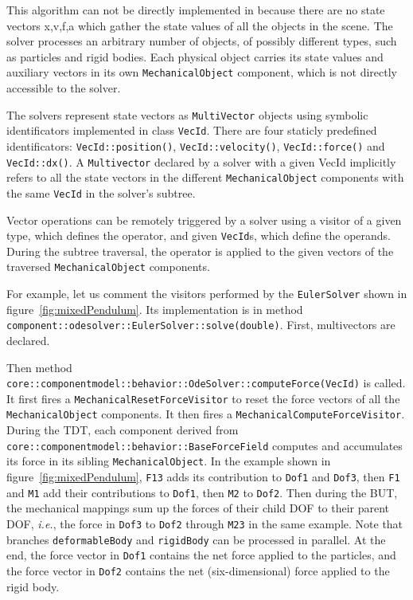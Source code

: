 This algorithm can not be directly implemented in \sofa because there are no state vectors x,v,f,a which gather the state values of all the objects in the scene.
The solver processes an arbitrary number of objects, of possibly different types, such as particles and rigid bodies. Each physical object carries its state values and auxiliary vectors in its own \texttt{MechanicalObject} component, which is not directly accessible to the solver.

The solvers represent state vectors as \texttt{MultiVector} objects using symbolic identificators implemented in class \texttt{VecId}.
There are four staticly predefined identificators: \texttt{VecId::position()}, \texttt{VecId::velocity()}, \texttt{VecId::force()} and \texttt{VecId::dx()}.
A \texttt{Multivector} declared by a solver with a given VecId implicitly refers to all the state vectors in the different \texttt{MechanicalObject} components with the same \texttt{VecId} in the solver's subtree.

Vector operations can be remotely triggered by a solver using a visitor of a given type, which defines the operator, and given \texttt{VecId}s, which define the operands.
During the subtree traversal, the operator is applied to the given vectors of the traversed \texttt{MechanicalObject} components.

For example, let us comment the visitors performed by the \texttt{EulerSolver} shown in figure~\ref{fig:mixedPendulum}. Its implementation is in method \texttt{component::odesolver::EulerSolver::solve(double)}.
First, multivectors are declared.

Then method \texttt{core::componentmodel::behavior::OdeSolver::computeForce(VecId)} is called. 
It first fires a \texttt{MechanicalResetForceVisitor} to reset the force vectors of all the \texttt{MechanicalObject} components. 
It then fires a  \texttt{MechanicalComputeForceVisitor}. 
During the TDT, each component derived from \texttt{core::componentmodel::behavior::BaseForceField} computes and accumulates its force in its sibling \texttt{MechanicalObject}. 
In the example shown in figure~\ref{fig:mixedPendulum}, \texttt{F13} adds its contribution to \texttt{Dof1} and \texttt{Dof3}, then \texttt{F1} and \texttt{M1} add their contributions to \texttt{Dof1}, then \texttt{M2} to \texttt{Dof2}. 
Then during the BUT, the mechanical mappings sum up the forces of their child DOF to their parent DOF, \textit{i.e.}, the force in \texttt{Dof3} to \texttt{Dof2} through \texttt{M23} in the same example.
Note that branches \texttt{deformableBody} and \texttt{rigidBody} can be processed in parallel.
At the end, the force vector in \texttt{Dof1} contains the net force applied to the particles, and the force vector in \texttt{Dof2} contains the net (six-dimensional) force applied to the rigid body.

